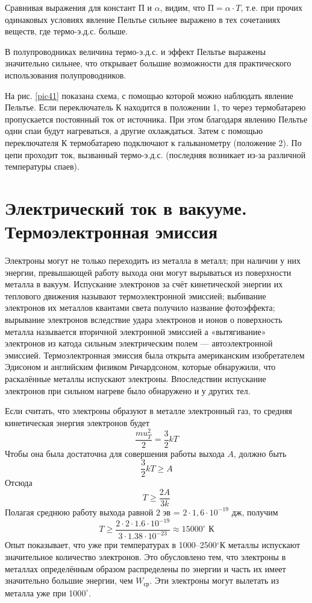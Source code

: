 \documentclass[a4paper,10pt]{book}
\begin{document}
Сравнивая выражения для констант П и $\alpha$, видим, что $\text{П}=\alpha\cdot T$, т.е. при прочих одинаковых условиях явление Пельтье сильнее выражено в тех сочетаниях веществ, где термо-э.д.с. больше.

В полупроводниках величина термо-э.д.с. и эффект Пельтье выражены значительно сильнее, что открывает большие возможности для практического использования полупроводников.

На рис. \ref{pic41} показана схема, с помощью которой можно наблюдать явление Пельтье. Если переключатель К находится в положении 1, то через термобатарею пропускается постоянный ток от источника. При этом благодаря явлению Пельтье одни спаи будут нагреваться, а другие охлаждаться. Затем с помощью переключателя К термобатарею подключают к гальванометру (положение 2). По цепи проходит ток, вызванный термо-э.д.с. (последняя возникает из-за различной температуры спаев).

\chapter{Электрический ток в вакууме. Термоэлектронная эмиссия}
Электроны могут не только переходить из металла в металл; при наличии у них энергии, превышающей работу выхода они могут вырываться из поверхности металла в вакуум. Испускание электронов за счёт кинетической энергии их теплового движения называют термоэлектронной эмиссией; выбивание электронов их металлов квантами света получило название фотоэффекта; вырывание электронов вследствие удара электронов и ионов о поверхность металла называется вторичной электронной эмиссией а «вытягивание» электронов из катода сильным электрическим полем — автоэлектронной эмиссией. Термоэлектронная эмиссия была открыта американским изобретателем Эдисоном и английским физиком Ричардсоном, которые обнаружили, что раскалённые металлы испускают электроны. Впоследствии испускание электронов при сильном нагреве было обнаружено и у других тел.

Если считать, что электроны образуют в металле электронный газ, то средняя кинетическая энергия электронов будет
\begin{equation*}
\frac{mu_T^2}{2} = \frac{3}{2}kT
\end{equation*}
Чтобы она была достаточна для совершения работы выхода $A$, должно быть
\begin{equation}\label{lecture20_1}
\frac{3}{2}kT \geq A
\end{equation}
Отсюда
\begin{equation*}
T \geq \frac{2A}{3k}
\end{equation*}
Полагая среднюю работу выхода равной $2 \text{ эв}$ = $2\cdot1,6 \cdot 10^{-19} \text{ дж}$, получим
\begin{equation*}
T \geq \frac{2\cdot2\cdot1.6\cdot10^{-19}}{3\cdot1.38\cdot10^{-23}}\approx 15 000^{\circ}\text{ К}
\end{equation*}
Опыт показывает, что уже при температурах в 1000–2500$^{\circ}$К металлы испускают значительное количество электронов. Это обусловлено тем, что электроны в металлах определённым образом распределены по энергии и часть их имеет значительно большие энергии, чем $W_\text{ср}$. Эти электроны могут вылетать из металла уже при 100$0^{\circ}$.
\end{document}
